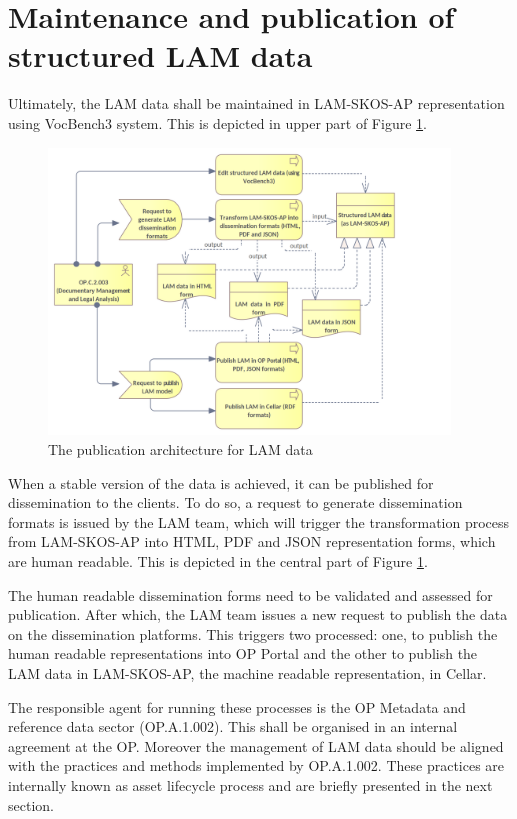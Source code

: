 	
	\section{Maintenance and publication of structured LAM data}
	\label{sec:lam-maintenance-publication}
	
	Ultimately, the LAM data shall be maintained in LAM-SKOS-AP representation using VocBench3 system. This is depicted in upper part of Figure \ref{fig:lam2-context}.
		
	\begin{figure}[!h]
		\centering
		\includegraphics[width=0.95\textwidth]{images/business/context/LAM2 context.png}
		\caption{The publication architecture for LAM data}
		\label{fig:lam2-context}
	\end{figure} 
	
	When a stable version of the data is achieved, it can be published for dissemination to the clients. To do so, a request to generate dissemination formats is issued by the LAM team, which will trigger the transformation process from LAM-SKOS-AP into HTML, PDF and JSON representation forms, which are human readable. This is depicted in the central part of Figure \ref{fig:lam2-context}. 
	
	The human readable dissemination forms need to be validated and assessed for publication. After which, the LAM team issues a new request to publish the data on the dissemination platforms. This triggers two processed: one, to publish the human readable representations into OP Portal and the other to publish the LAM data in LAM-SKOS-AP, the machine readable representation, in Cellar. 
	
	The responsible agent for running these processes is the OP Metadata and reference data sector (OP.A.1.002). This shall be organised in an internal agreement at the OP. Moreover the management of LAM data should be aligned with the practices and methods implemented by OP.A.1.002. These practices are internally known as asset lifecycle process and are briefly presented in the next section. 
	
